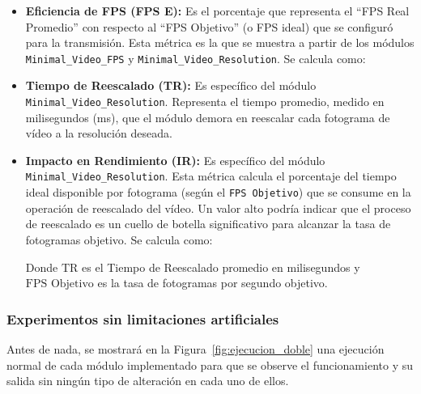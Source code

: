 \begin{itemize}
    \item \textbf{Eficiencia de FPS (FPS E):} Es el porcentaje que representa el ``FPS Real Promedio'' con respecto al ``FPS Objetivo'' (o FPS ideal) que se configuró para la transmisión. Esta métrica es la que se muestra a partir de los módulos \texttt{Minimal\_Video\_FPS} y \texttt{Minimal\_Video\_Resolution}. Se calcula como:
    \begin{center}
    \end{center}

    \item \textbf{Tiempo de Reescalado (TR):} Es específico del módulo \texttt{Minimal\_Video\_Resolution}. Representa el tiempo promedio, medido en milisegundos (ms), que el módulo demora en reescalar cada fotograma de vídeo a la resolución deseada.
    \begin{center}
    \end{center}

    \item \textbf{Impacto en Rendimiento (IR):} Es específico del módulo \texttt{Minimal\_Video\_Resolution}. Esta métrica calcula el porcentaje del tiempo ideal disponible por fotograma (según el \texttt{FPS Objetivo}) que se consume en la operación de reescalado del vídeo. Un valor alto podría indicar que el proceso de reescalado es un cuello de botella significativo para alcanzar la tasa de fotogramas objetivo. Se calcula como:
    \begin{center}
    \end{center}
    Donde \(\text{TR}\) es el Tiempo de Reescalado promedio en milisegundos y \(\text{FPS}\text{~Objetivo}\) es la tasa de fotogramas por segundo objetivo.
\end{itemize}

\newpage

\subsubsection{Experimentos sin limitaciones artificiales}

Antes de nada, se mostrará en la Figura~\ref{fig:ejecucion_doble} una ejecución normal de cada módulo implementado para que se observe el funcionamiento y su salida sin ningún tipo de alteración en cada uno de ellos. 
\vspace{\baselineskip}

